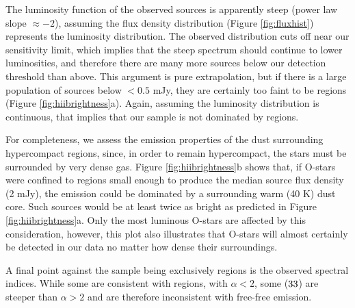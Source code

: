 \documentclass[twocolumn]{aastex61}
\begin{document}
The luminosity function of the observed sources is apparently steep (power law
slope $\approx-2$), assuming the flux density distribution (Figure
\ref{fig:fluxhist}) represents the luminosity distribution.  The observed
distribution cuts off near our sensitivity limit, which implies that the steep
spectrum should continue to lower luminosities, and therefore there are many
more sources below our detection threshold than above.  This argument is pure
extrapolation,  but if there is a large population of sources below $<0.5$ mJy,
they are certainly too faint to be \hii regions (Figure
\ref{fig:hiibrightness}a).  Again, assuming the luminosity distribution is
continuous, that implies that our sample is not dominated by \hii regions.

For completeness, we assess the emission properties of the dust surrounding
hypercompact \hii regions, since, in order to remain hypercompact, the stars
must be surrounded by very dense gas.  Figure \ref{fig:hiibrightness}b shows
that, if O-stars were confined to \hii regions small enough to produce the
median source flux density (2 mJy), the emission could be dominated by a
surrounding warm (40 K) dust core.  Such sources would be at least twice as
bright as predicted in Figure \ref{fig:hiibrightness}a.  Only the most luminous
O-stars are affected by this consideration, however, this plot also illustrates
that O-stars will almost certainly be detected in our data no matter how dense
their surroundings.

A final point against the sample being exclusively \hii regions is the observed
spectral indices.  While some are consistent with \hii regions, with $\alpha <
2$, some ($33$) are steeper than $\alpha>2$ and are therefore inconsistent
with free-free emission.
\end{document}
